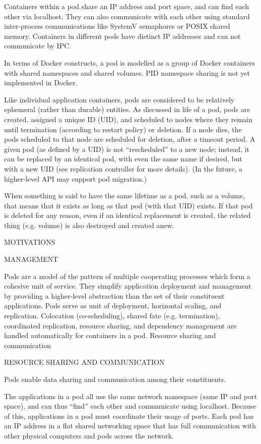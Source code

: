 Containers within a pod share an IP address and port space, and can find each other via localhost. They can also communicate with each other using standard inter-process communications like SystemV semaphores or POSIX shared memory. Containers in different pods have distinct IP addresses and can not communicate by IPC.

In terms of Docker constructs, a pod is modelled as a group of Docker containers with shared namespaces and shared volumes. PID namespace sharing is not yet implemented in Docker.

Like individual application containers, pods are considered to be relatively ephemeral (rather than durable) entities. As discussed in life of a pod, pods are created, assigned a unique ID (UID), and scheduled to nodes where they remain until termination (according to restart policy) or deletion. If a node dies, the pods scheduled to that node are scheduled for deletion, after a timeout period. A given pod (as defined by a UID) is not “rescheduled” to a new node; instead, it can be replaced by an identical pod, with even the same name if desired, but with a new UID (see replication controller for more details). (In the future, a higher-level API may support pod migration.)

When something is said to have the same lifetime as a pod, such as a volume, that means that it exists as long as that pod (with that UID) exists. If that pod is deleted for any reason, even if an identical replacement is created, the related thing (e.g. volume) is also destroyed and created anew.

MOTIVATIONS

MANAGEMENT

Pods are a model of the pattern of multiple cooperating processes which form a cohesive unit of service. They simplify application deployment and management by providing a higher-level abstraction than the set of their constituent applications. Pods serve as unit of deployment, horizontal scaling, and replication. Colocation (co-scheduling), shared fate (e.g. termination), coordinated replication, resource sharing, and dependency management are handled automatically for containers in a pod.
Resource sharing and communication

RESOURCE SHARING AND COMMUNICATION

Pods enable data sharing and communication among their constituents.

The applications in a pod all use the same network namespace (same IP and port space), and can thus “find” each other and communicate using localhost. Because of this, applications in a pod must coordinate their usage of ports. Each pod has an IP address in a flat shared networking space that has full communication with other physical computers and pods across the network.

